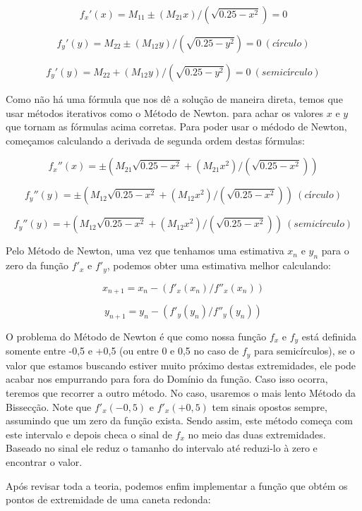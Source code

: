 {{{{{{$$
f_x'(x)=M_{11} \pm (M_{21}x)/(\sqrt{0.25-x^2})=0
$$

$$
f_y'(y)=M_{22} \pm (M_{12}y)/(\sqrt{0.25-y^2})=0\ {(círculo)}
$$

$$
f_y'(y)=M_{22} + (M_{12}y)/(\sqrt{0.25-y^2})=0\ {(semicírculo)}
$$


Como não há uma fórmula que nos dê a solução de maneira direta, temos
que usar métodos iterativos como o Método de Newton. para achar os
valores $x$ e $y$ que tornam as fórmulas acima corretas. Para poder
usar o médodo de Newton, começamos calculando a derivada de segunda
ordem destas fórmulas:

$$
f_x''(x)= \pm (M_{21}\sqrt{0.25-x^2}+(M_{21}x^2)/(\sqrt{0.25-x^2}))
$$

$$
f_y''(y)= \pm (M_{12}\sqrt{0.25-x^2}+(M_{12}x^2)/(\sqrt{0.25-x^2}))\ (círculo)
$$

$$
f_y''(y)= + (M_{12}\sqrt{0.25-x^2}+(M_{12}x^2)/(\sqrt{0.25-x^2}))\ (semicírculo)
$$


Pelo Método de Newton, uma vez que tenhamos uma estimativa $x_n$ e
$y_n$ para o zero da função $f'_x$ e $f'_y$, podemos obter uma
estimativa melhor calculando:

$$
x_{n+1} = x_{n} - (f'_x(x_n)/f''_x(x_n))
$$

$$
y_{n+1} = y_{n} - (f'_y(y_n)/f''_y(y_n))
$$

O problema do Método de Newton é que como nossa função $f_x$ e $f_y$
está definida somente entre -0,5 e +0,5 (ou entre 0 e 0,5 no caso de
$f_y$ para semicírculos), se o valor que estamos buscando estiver
muito próximo destas extremidades, ele pode acabar nos empurrando para
fora do Domínio da função. Caso isso ocorra, teremos que recorrer a
outro método. No caso, usaremos o mais lento Método da Bissecção. Note
que $f'_x(-0,5)$ e $f'_x(+0,5)$ tem sinais opostos sempre, assumindo
que um zero da função exista. Sendo assim, este método começa com este
intervalo e depois checa o sinal de $f_x$ no meio das duas
extremidades. Baseado no sinal ele reduz o tamanho do intervalo até
reduzi-lo à zero e encontrar o valor.

Após revisar toda a teoria, podemos enfim implementar a função que
obtém os pontos de extremidade de uma caneta redonda:

}}}}}}

